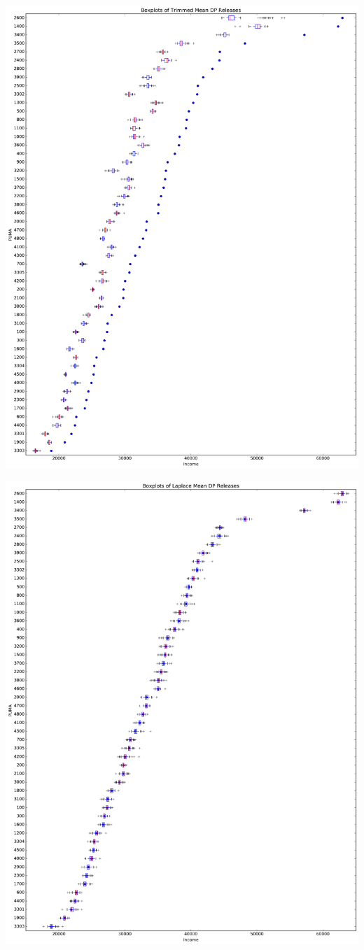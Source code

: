 \documentclass[12pt]{article}
\begin{document}
\includegraphics[scale=0.45]{trimmed_means_graph.png}

\includegraphics[scale=0.45]{laplace_means_graph.png}
\end{document}
